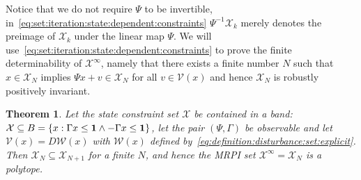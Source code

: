 \documentclass[journal]{IEEEtran}
\newcounter{thmcount}
\newtheorem{thm}[thmcount]{Theorem}
\theoremstyle{remark}
\theoremstyle{definition}
\begin{document}
%
Notice that we do not require $\Psi$ to be invertible, in~\eqref{eq:set:iteration:state:dependent:constraints} 
$\Psi^{-1}\mathcal X_k$ merely denotes the preimage of $\mathcal X_k$ under the linear map $\Psi$.
%
We will use~\eqref{eq:set:iteration:state:dependent:constraints} to prove the finite determinability of
$\mathcal X^\infty$, namely that there exists a finite number $N$ such that $x\in\mathcal X_N$ implies
$\Psi x + v \in\mathcal X_N$ for all $v\in\mathcal V(x)$ and hence $\mathcal X_N$ is robustly positively invariant.
%
\begin{thm}\label{thm:finite:MRPI:set:state:dependable}
Let the state constraint set $\mathcal X$ be contained in a band: $\mathcal X\subseteq B=\{x:\Gamma x\leq{\bf{1}}\wedge 
-\Gamma x\leq{\bf{1}}\}$, let the pair $(\Psi,\Gamma)$ be observable and let $\mathcal V(x)=D\mathcal W(x)$ with 
$\mathcal W(x)$ defined by~\eqref{eq:definition:disturbance:set:explicit}. 
%
Then $\mathcal X_N\subseteq \mathcal X_{N+1}$ for a finite $N$, and hence the MRPI set $\mathcal X^\infty =\mathcal X_N$ 
is a polytope.
\end{thm}
%
%
\end{document}
